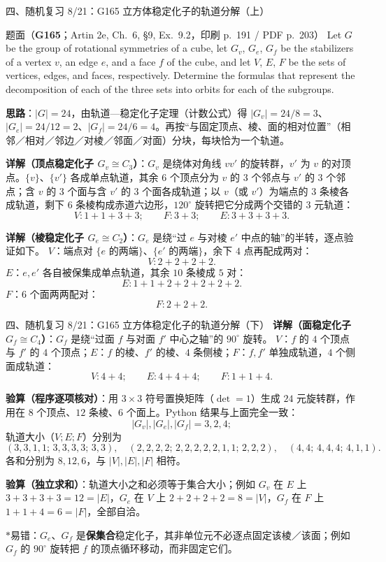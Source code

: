 \documentclass[aspectratio=169,10pt,fontset=none]{ctexbeamer}
\newcommand{\ex}[1]{\textcolor{accent}{\footnotesize\bfseries #1}}
\newcommand{\key}[1]{\textcolor{ink}{\bfseries #1}}
\newcommand{\starpt}{\textcolor{accent}{\bfseries$\ast$}}
\begin{document}
\begin{frame}[t]{四、随机复习 8/21：G165 立方体稳定化子的轨道分解（上）}
\label{ex:G165}
\scriptsize
\begin{block}{\footnotesize 题面（\ex{G165}；Artin 2e, Ch.~6, §9, Ex.~9.2，印刷 p.~191 / PDF p.~203）}
Let $G$ be the group of rotational symmetries of a cube, let $G_v$, $G_e$, $G_f$ be the stabilizers of a vertex $v$, an edge $e$, and a face $f$ of the cube, and let $V$, $E$, $F$ be the sets of vertices, edges, and faces, respectively. Determine the formulas that represent the decomposition of each of the three sets into orbits for each of the subgroups.
\end{block}
\key{思路}：$|G|=24$，由轨道—稳定化子定理（计数公式）得 $|G_v|=24/8=3$、$|G_e|=24/12=2$、$|G_f|=24/6=4$。再按“与固定顶点、棱、面的相对位置”（相邻／相对／邻边／对棱／邻面／对面）分块，每块恰为一个轨道。

\key{详解（顶点稳定化子 $G_v\cong C_3$）}：$G_v$ 是绕体对角线 $vv'$ 的旋转群，$v'$ 为 $v$ 的对顶点。$\{v\}$、$\{v'\}$ 各成单点轨道，其余 $6$ 个顶点分为 $v$ 的 $3$ 个邻点与 $v'$ 的 $3$ 个邻点；含 $v$ 的 $3$ 个面与含 $v'$ 的 $3$ 个面各成轨道；以 $v$（或 $v'$）为端点的 $3$ 条棱各成轨道，剩下 $6$ 条棱构成赤道六边形，$120^\circ$ 旋转把它分成两个交错的 $3$ 元轨道：
\[ V:1+1+3+3;\qquad F:3+3;\qquad E:3+3+3+3. \]

\key{详解（棱稳定化子 $G_e\cong C_2$）}：$G_e$ 是绕“过 $e$ 与对棱 $e'$ 中点的轴”的半转，逐点验证如下。
$V$：端点对 $\{e$ 的两端$\}$、$\{e'$ 的两端$\}$，余下 $4$ 点再配成两对：
\[ V:2+2+2+2. \]
$E$：$e,e'$ 各自被保集成单点轨道，其余 $10$ 条棱成 $5$ 对：
\[ E:1+1+2+2+2+2+2. \]
$F$：$6$ 个面两两配对：
\[ F:2+2+2. \]
\end{frame}

\begin{frame}[t]{四、随机复习 8/21：G165 立方体稳定化子的轨道分解（下）}
\scriptsize
\key{详解（面稳定化子 $G_f\cong C_4$）}：$G_f$ 是绕“过面 $f$ 与对面 $f'$ 中心之轴”的 $90^\circ$ 旋转。
$V$：$f$ 的 $4$ 个顶点与 $f'$ 的 $4$ 个顶点；$E$：$f$ 的棱、$f'$ 的棱、$4$ 条侧棱；$F$：$f,f'$ 单独成轨道，$4$ 个侧面成轨道：
\[ V:4+4;\qquad E:4+4+4;\qquad F:1+1+4. \]

\key{验算（程序逐项核对）}：用 $3\times3$ 符号置换矩阵（$\det=1$）生成 $24$ 元旋转群，作用在 $8$ 个顶点、$12$ 条棱、$6$ 个面上。Python 结果与上面完全一致：
\[ |G_v|,|G_e|,|G_f|=3,2,4; \]
轨道大小（$V;E;F$）分别为
\[ (3,3,1,1;\,3,3,3,3;\,3,3),\quad (2,2,2,2;\,2,2,2,2,2,1,1;\,2,2,2),\quad (4,4;\,4,4,4;\,4,1,1). \]
各和分别为 $8,12,6$，与 $|V|,|E|,|F|$ 相符。

\key{验算（独立求和）}：轨道大小之和必须等于集合大小；例如 $G_v$ 在 $E$ 上 $3+3+3+3=12=|E|$，$G_e$ 在 $V$ 上 $2+2+2+2=8=|V|$，$G_f$ 在 $F$ 上 $1+1+4=6=|F|$，全部自洽。

\starpt 易错：$G_e$、$G_f$ 是\textbf{保集合}稳定化子，其非单位元不必逐点固定该棱／该面；例如 $G_f$ 的 $90^\circ$ 旋转把 $f$ 的顶点循环移动，而非固定它们。
\end{frame}
\end{document}
